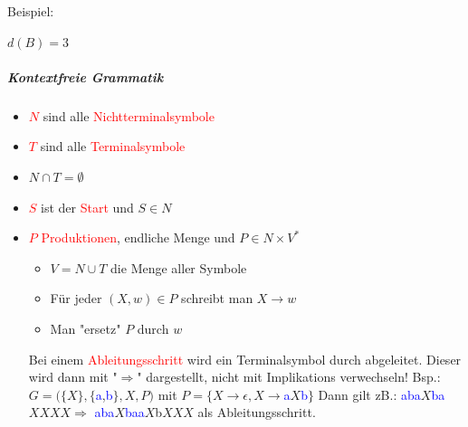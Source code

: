 \documentclass[12pt]{article}
\begin{document}
\begin{flushleft}
    \vspace{1cm}
    Beispiel: \linebreak
    \linebreak
     \linebreak \linebreak
    $d(B) = 3$
\end{flushleft}
\subparagraph{\large Kontextfreie Grammatik}
\normalsize
\begin{flushleft}
    \begin{itemize}
        \item \textcolor{red}{$N$} sind alle \textcolor{red}{Nichtterminalsymbole}
        \item \textcolor{red}{$T$} sind alle \textcolor{red}{Terminalsymbole}
        \item $N \cap T = \emptyset$
        \item \textcolor{red}{$S$} ist der \textcolor{red}{Start} und $S \in N$
        \item \textcolor{red}{$P$ Produktionen}, endliche Menge und $P \in N \times V^\ast$
        \begin{itemize}
            \item $V = N \cup T$ die Menge aller Symbole
            \item Für jeder $(X,w) \in P $ schreibt man $X \rightarrow w$
            \item Man "ersetz" $P$ durch $w$
        \end{itemize}
        Bei einem \textcolor{red}{Ableitungsschritt} wird ein Terminalsymbol durch abgeleitet. Dieser wird dann mit "$\Rightarrow$" dargestellt, nicht mit Implikations verwechseln!
        \linebreak \linebreak Bsp.: \linebreak
        $G = (\{X\},\{$\textcolor{blue}{a},\textcolor{blue}{b}$\},X,P)$ mit $ P = \{X \rightarrow \epsilon,X \rightarrow $\textcolor{blue}{a}$X$\textcolor{blue}{b}$\}$ \linebreak
        \linebreak
        Dann gilt zB.: \textcolor{blue}{aba}$X$\textcolor{blue}{ba}$XXXX \Rightarrow$  \textcolor{blue}{aba}$X$\textcolor{blue}{baa}$X$b$XXX$ als Ableitungsschritt.

\end{itemize}
\end{flushleft}
\end{document}
